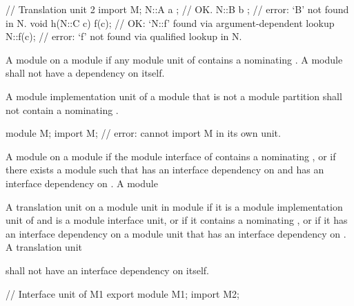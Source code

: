 \begin{std.txt}
\begin{example}
\begin{Program}
     // Translation unit 2
     import M;
     N::A a { };                // OK.
     N::B b { };                // error: `B' not found in N.
     void h(N::C c) {
        f(c);                   // OK: `N::f' found via argument-dependent lookup
        N::f(c);                // error: `f' not found via qualified lookup in N.
     }
  \end{Program}
  \end{example}

  \alinea
\begin{before}\color{addclr}
  A module   on a module 
  if any module unit of  contains a 
  nominating . A module shall not have a dependency on
  itself.
\end{before}
\begin{after}\color{addclr}
  A module implementation unit of a module 
  that is not a module partition
  shall not contain a 
  nominating .
\end{after}
  \begin{example}
  \begin{codeblock}
     module M;
     import M;          // error: cannot import M in its own unit.
  \end{codeblock} 
  \end{example}

  \alinea 
\begin{before}\color{addclr}
  A module   on a module
   if the module interface of  contains a
   nominating ,
  or if there exists a module  such that  has an
  interface dependency on  and  has an interface dependency
  on .  A module
\end{before}
\begin{after}\color{addclr}
  A translation unit  on a module unit  in module 
  if it is a module implementation unit of  and  is a module interface unit,
  or if it contains a  nominating , or if it has
  an interface dependency on a module unit that has an interface dependency on .
  A translation unit
\end{after}
  shall not have an interface dependency on itself.
  \begin{example}
  \begin{Program}
     // Interface unit of M1
     export module M1;
     import M2;


\end{Program}
\end{example}
\end{std.txt}
